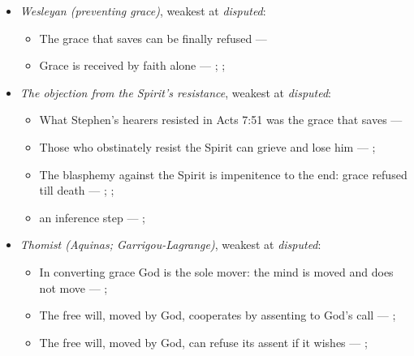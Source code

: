 \documentclass[11pt]{article}
\begin{document}
\begin{itemize}
\begin{itemize}
\item Grace is received by faith alone --- \cite[Augsburg Confession IV.1–3]{concordia-triglotta-1921}; \cite[Sermon 1, III.1]{wesley-sermons-1872}; \cite[Trent, Session VI (1547), canon 9]{tanner-decrees-1990}
\end{itemize}
\item \emph{Wesleyan (preventing grace)}, weakest at \emph{disputed}:
\begin{itemize}
\item The grace that saves can be finally refused --- \cite[397]{wesley-works-9-1827}
\item Grace is received by faith alone --- \cite[Augsburg Confession IV.1–3]{concordia-triglotta-1921}; \cite[Sermon 1, III.1]{wesley-sermons-1872}; \cite[Trent, Session VI (1547), canon 9]{tanner-decrees-1990}
\end{itemize}
\item \emph{The objection from the Spirit’s resistance}, weakest at \emph{disputed}:
\begin{itemize}
\item What Stephen’s hearers resisted in Acts 7:51 was the grace that saves --- \cite[Five Arminian Articles (1610), art. 4]{schaff-creeds-christendom-3-1977}
\item Those who obstinately resist the Spirit can grieve and lose him --- \cite[Solid Declaration II.83]{concordia-triglotta-1921}; \cite[Solid Declaration XI.42]{concordia-triglotta-1921}
\item The blasphemy against the Spirit is impenitence to the end: grace refused till death --- \cite[325]{npnf1-06-1888}; \cite[II-II q.14 a.1]{aquinas-summa-1920}; \cite[74]{calvin-harmony-evangelists-2-1845}
\item an inference step --- \cite[325]{npnf1-06-1888}; \cite[On Rebuke and Grace, ch. 43]{npnf1-05-1887}
\end{itemize}
\item \emph{Thomist (Aquinas; Garrigou-Lagrange)}, weakest at \emph{disputed}:
\begin{itemize}
\item In converting grace God is the sole mover: the mind is moved and does not move --- \cite[I-II q.111 a.2]{aquinas-summa-1920}; \cite[ch. IV]{garrigou-lagrange-grace-1952}
\item The free will, moved by God, cooperates by assenting to God’s call --- \cite[Trent, Session VI (1547), canon 4]{tanner-decrees-1990}; \cite[45]{waterworth-trent-1848}
\item The free will, moved by God, can refuse its assent if it wishes --- \cite[Trent, Session VI (1547), canon 4]{tanner-decrees-1990}; \cite[45]{waterworth-trent-1848}

\end{itemize}
\end{itemize}
\end{document}
